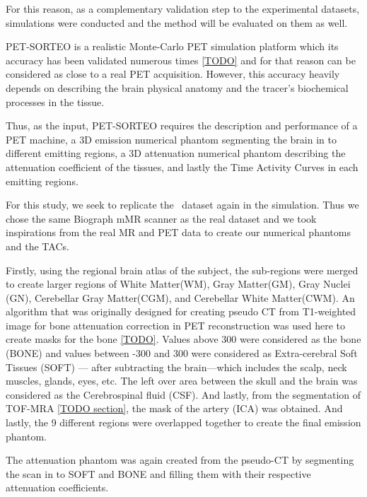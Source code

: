 For this reason, as a complementary validation step to the experimental datasets, simulations were conducted and the method will be evaluated on them as well.

PET-SORTEO is a realistic Monte-Carlo PET simulation platform which its accuracy has been validated numerous times \ref{TODO} and for that reason can be considered as close to a real PET acquisition.
However, this accuracy heavily depends on describing the brain physical anatomy and the tracer's biochemical processes in the tissue.

Thus, as the input, PET-SORTEO requires the description and performance of a PET machine, a 3D emission numerical phantom segmenting the brain in to different emitting regions, a 3D attenuation numerical phantom describing the attenuation coefficient of the tissues, and lastly the Time Activity Curves in each emitting regions.

For this study, we seek to replicate the \fdg$\,$ dataset again in the simulation.
Thus we chose the same Biograph mMR scanner as the real dataset and we took inspirations from the real MR and PET data to create our numerical phantoms and the TACs.

Firstly, using the regional brain atlas of the subject, the sub-regions were merged to create larger regions of White Matter(WM), Gray Matter(GM), Gray Nuclei (GN), Cerebellar Gray Matter(CGM), and Cerebellar White Matter(CWM).
An algorithm that was originally designed for creating pseudo CT from T1-weighted image for bone attenuation correction in PET reconstruction was used here to create masks for the bone \ref{TODO}.
Values above 300 were considered as the bone (BONE) and values between -300 and 300 were considered as Extra-cerebral Soft Tissues (SOFT) --- after subtracting the brain---which includes the scalp, neck muscles, glands, eyes, etc.
The left over area between the skull and the brain was considered as the Cerebrospinal fluid (CSF).
And lastly, from the segmentation of TOF-MRA \ref{TODO section}, the mask of the artery (ICA) was obtained.
And lastly, the 9 different regions were overlapped together to create the final emission phantom.

The attenuation phantom was again created from the pseudo-CT by segmenting the scan in to SOFT and BONE and filling them with their respective attenuation coefficients.

